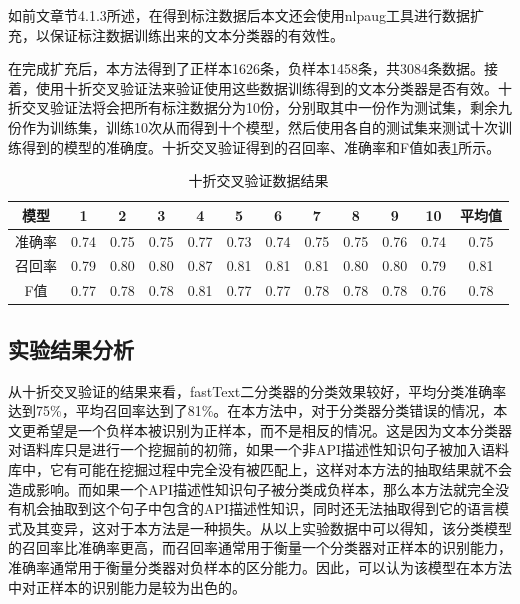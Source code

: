 如前文章节4.1.3所述，在得到标注数据后本文还会使用nlpaug工具进行数据扩充，以保证标注数据训练出来的文本分类器的有效性。

在完成扩充后，本方法得到了正样本1626条，负样本1458条，共3084条数据。接着，使用十折交叉验证法来验证使用这些数据训练得到的文本分类器是否有效。十折交叉验证法将会把所有标注数据分为10份，分别取其中一份作为测试集，剩余九份作为训练集，训练10次从而得到十个模型，然后使用各自的测试集来测试十次训练得到的模型的准确度。十折交叉验证得到的召回率、准确率和F值如表\ref{fig:fig2}所示。

\begin{center}
    \begin{table}[h]
        \centering
        \caption{十折交叉验证数据结果}
        \label{fig:fig2}
        \begin{tabular}{cccccccccccc}
        \hline
        模型  & 1    & 2    & 3    & 4    & 5    & 6    & 7    & 8    & 9    & 10   & 平均值  \\ \hline
        准确率 & 0.74 & 0.75 & 0.75 & 0.77 & 0.73 & 0.74 & 0.75 & 0.75 & 0.76 & 0.74 & 0.75 \\
        召回率 & 0.79 & 0.80 & 0.80 & 0.87 & 0.81 & 0.81 & 0.81 & 0.80 & 0.80 & 0.79 & 0.81 \\
        F值  & 0.77 & 0.78 & 0.78 & 0.81 & 0.77 & 0.77 & 0.78 & 0.78 & 0.78 & 0.76 & 0.78 \\ \hline
        \end{tabular}
        \end{table}
\end{center}


\subsection{实验结果分析}
从十折交叉验证的结果来看，fastText二分类器的分类效果较好，平均分类准确率达到75\%，平均召回率达到了81\%。在本方法中，对于分类器分类错误的情况，本文更希望是一个负样本被识别为正样本，而不是相反的情况。这是因为文本分类器对语料库只是进行一个挖掘前的初筛，如果一个非API描述性知识句子被加入语料库中，它有可能在挖掘过程中完全没有被匹配上，这样对本方法的抽取结果就不会造成影响。而如果一个API描述性知识句子被分类成负样本，那么本方法就完全没有机会抽取到这个句子中包含的API描述性知识，同时还无法抽取得到它的语言模式及其变异，这对于本方法是一种损失。从以上实验数据中可以得知，该分类模型的召回率比准确率更高，而召回率通常用于衡量一个分类器对正样本的识别能力，准确率通常用于衡量分类器对负样本的区分能力。因此，可以认为该模型在本方法中对正样本的识别能力是较为出色的。

